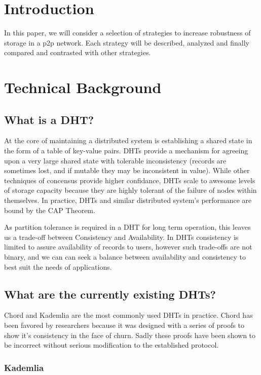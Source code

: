 \documentclass[conference]{IEEEtran}
\begin{document}
\section{Introduction}

In this paper, we will consider a selection of strategies to increase robustness of storage in a p2p network.
Each strategy will be described, analyzed and finally compared and contrasted with other strategies.


\section{Technical Background}
\subsection{What is a DHT?}
At the core of maintaining a distributed system is establishing a shared state in the form of a table of key-value pairs.
DHTs provide a mechanism for agreeing upon a very large shared state with tolerable inconsistency (records are sometimes lost, and if mutable they may be inconsistent in value).
While other techniques of concensus provide higher confidance, DHTs scale to awesome levels of storage capacity because they are highly tolerant of the failure of nodes within themselves.
In practice, DHTs and similar distributed system's performance are bound by the CAP Theorem\cite{brewer2010certain}.

As partition tolerance is required in a DHT for long term operation, this leaves us a trade-off between Consistency and Availability.
In DHTs consistency is limited to assure availability of records to users, however such trade-offs are not binary, and we can can seek a balance between availability and consistency to best suit the needs of applications.


\subsection{What are the currently existing DHTs?}

Chord and Kademlia are the most commonly used DHTs in practice. 
Chord has been favored by researchers because it was designed with a series of proofs to show it's consistency in the face of churn.
Sadly these proofs have been shown to be incorrect\cite{} without serious modification to the established protocol.

\subsubsection{Kademlia}
\end{document}
